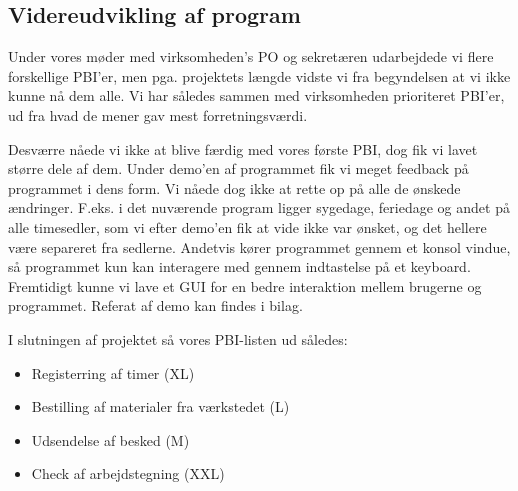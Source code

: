\subsection{Videreudvikling af program}

Under vores møder med virksomheden's PO og sekretæren udarbejdede vi flere forskellige PBI'er, men pga. projektets længde vidste vi fra begyndelsen at vi ikke kunne nå dem alle. Vi har således sammen med virksomheden prioriteret PBI'er, ud fra hvad de mener gav mest forretningsværdi.

Desværre nåede vi ikke at blive færdig med vores første PBI, dog fik vi lavet større dele af dem. Under demo'en af programmet fik vi meget feedback på programmet i dens form. Vi nåede dog ikke at rette op på alle de ønskede ændringer. F.eks. i det nuværende program ligger sygedage, feriedage og andet på alle timesedler, som vi efter demo'en fik at vide ikke var ønsket, og det hellere være separeret fra sedlerne. Andetvis kører programmet gennem et konsol vindue, så programmet kun kan interagere med gennem indtastelse på et keyboard. Fremtidigt kunne vi lave et GUI for en bedre interaktion mellem brugerne og programmet. Referat af demo kan findes i bilag.

I slutningen af projektet så vores PBI-listen ud således:
\begin{itemize}
\item Registerring af timer (XL)
\item Bestilling af materialer fra værkstedet (L) 
\item Udsendelse af besked (M)
\item Check af arbejdstegning (XXL)
\end{itemize}


